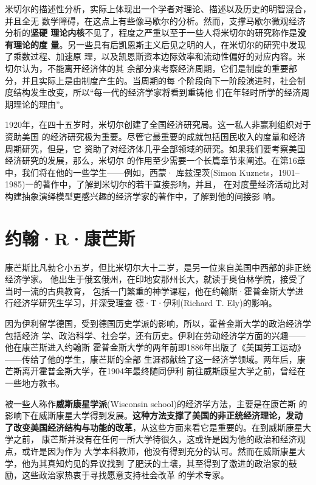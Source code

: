 米切尔的描述性分析，实际上体现出一个学者对理论、描述以及历史的明智混合，并且全无
数学障碍，在这点上有些像马歇尔的分析。然而，支撑马歇尔微观经济分析的\textbf{坚硬
理论内核}不见了，程度之严重以至于一些人将米切尔的研究称作是\textbf{没有理论的度
量}。另一些具有后凯恩斯主义后见之明的人，在米切尔的研究中发现了乘数过程、加速原
理，以及凯恩斯资本边际效率和流动性偏好的对应内容。米切尔认为，不能离开经济体的其
余部分来考察经济周期，它们是制度的重要部分，并且实际上是由制度产生的。当周期的每
个阶段向下一阶段演进时，社会制度结构发生改变，所以“每一代的经济学家将看到重铸他
们在年轻时所学的经济周期理论的理由”。

1920年，在四十五岁时，米切尔创建了全国经济研究局。这一私人非赢利组织对于资助美国
的经济研究极为重要。尽管它最重要的成就包括国民收入的度量和经济周期研究，但是，它
资助了对经济体几乎全部领域的研究。如果我们要考察美国经济研究的发展，那么，米切尔
的作用至少需要一个长篇章节来阐述。在第16章中，我们将在他的一些学生——例如，西蒙·
库兹涅茨(Simon Kuznets，1901--1985)一的著作中，了解到米切尔的若干直接影响，并且，
在对度量经济活动比对构建抽象演绎模型更感兴趣的经济学家的著作中，了解到他的间接影
响。

\section{约翰·R·康芒斯}

康芒斯比凡勃仑小五岁，但比米切尔大十二岁，是另一位来自美国中西部的非正统经济学家。
他出生于俄玄俄州，在印地安那州长大，就读于奥伯林学院，接受了当时一流的古典教育，
包括一门繁重的神学课程，他在约翰斯·霍普金斯大学进行经济学研究生学习，并深受理查
德·T·伊利(Richard T. Ely)的影响。

因为伊利留学德国，受到德国历史学派的影响，所以，霍普金斯大学的政治经济学包括经济
学、政治科学、社会学，还有历史。伊利在劳动经济学方面的兴趣——他在康芒斯进入约翰斯
霍普金斯大学的两年前即1886年出版了《美国劳工运动》——传给了他的学生，康芒斯的全部
生涯都献给了这一经济学领域。两年后，康芒斯离开霍普金斯大学，在1904年最终随同伊利
前往威斯康星大学之前，曾经在一些地方教书。

被一些人称作\textbf{威斯康星学派}(Wisconsin school)的经济学方法，主要是在康芒斯
的影响下在威斯康星大学得到发展。\textbf{这种方法支撑了美国的非正统经济理论，发动
了改变美国经济结构与功能的改革}，从这些方面来看它是重要的。在到威斯康星大学之前，
康芒斯并没有在任何一所大学待很久，这或许是因为他的政治和经济观点，或许是因为作为
大学本科教师，他没有得到充分的认可。然而在威斯康星大学，他为其真知灼见的异议找到
了肥沃的土壤，其至得到了激进的政治家的鼓励，这些政治家热衷于寻找愿意支持社会改革
的学术专家。

